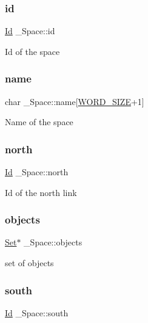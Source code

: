 \subsubsection{\texorpdfstring{id}{id}}
{\footnotesize\ttfamily \hyperlink{types_8h_a845e604fb28f7e3d97549da3448149d3}{Id} \+\_\+\+Space\+::id}

Id of the space \mbox{\label{struct__Space_aa1c9c994c2d16ecf3ef46138685fdfdc}} 
\subsubsection{\texorpdfstring{name}{name}}
{\footnotesize\ttfamily char \+\_\+\+Space\+::name\mbox{[}\hyperlink{types_8h_a92ed8507d1cd2331ad09275c5c4c1c89}{W\+O\+R\+D\+\_\+\+S\+I\+ZE}+1\mbox{]}}

Name of the space \mbox{\label{struct__Space_ae5ebe53ce79514d7d2d93911e0159252}} 
\subsubsection{\texorpdfstring{north}{north}}
{\footnotesize\ttfamily \hyperlink{types_8h_a845e604fb28f7e3d97549da3448149d3}{Id} \+\_\+\+Space\+::north}

Id of the north link \mbox{\label{struct__Space_a661ed8b0fc8085b6db70188aa5085625}} 
\subsubsection{\texorpdfstring{objects}{objects}}
{\footnotesize\ttfamily \hyperlink{set_8h_a6d3b7f7c92cbb4577ef3ef7ddbf93161}{Set}$\ast$ \+\_\+\+Space\+::objects}

set of objects \mbox{\label{struct__Space_a646b68c22a0bbf1685033c96109d31d1}} 
\subsubsection{\texorpdfstring{south}{south}}
{\footnotesize\ttfamily \hyperlink{types_8h_a845e604fb28f7e3d97549da3448149d3}{Id} \+\_\+\+Space\+::south}

